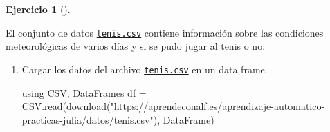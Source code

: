 \documentclass[
  a4paper,
]{scrreport}
\newenvironment{Shaded}{\begin{snugshade}}{\end{snugshade}}
\newcommand{\BuiltInTok}[1]{\textcolor[rgb]{0.00,0.23,0.31}{#1}}
\newcommand{\FunctionTok}[1]{\textcolor[rgb]{0.28,0.35,0.67}{#1}}
\newcommand{\ImportTok}[1]{\textcolor[rgb]{0.00,0.46,0.62}{#1}}
\newcommand{\NormalTok}[1]{\textcolor[rgb]{0.00,0.23,0.31}{#1}}
\newcommand{\OperatorTok}[1]{\textcolor[rgb]{0.37,0.37,0.37}{#1}}
\newcommand{\StringTok}[1]{\textcolor[rgb]{0.13,0.47,0.30}{#1}}
\theoremstyle{definition}
\newtheorem{exercise}{Ejercicio}[chapter]
\theoremstyle{remark}
\begin{document}
\begin{exercise}[]\protect\hypertarget{exr-arboles-decision-1}{}\label{exr-arboles-decision-1}

El conjunto de datos \href{./datos/tenis.csv}{\texttt{tenis.csv}}
contiene información sobre las condiciones meteorológicas de varios días
y si se pudo jugar al tenis o no.

\begin{enumerate}
\def\labelenumi{\alph{enumi}.}
\item
  Cargar los datos del archivo
  \href{https://aprendeconalf.es/aprendizaje-automatico-practicas-julia/datos/tenis.csv}{\texttt{tenis.csv}}
  en un data frame.

  \begin{tcolorbox}[enhanced jigsaw, left=2mm, colback=white, coltitle=black, opacitybacktitle=0.6, titlerule=0mm, breakable, bottomrule=.15mm, toptitle=1mm, bottomtitle=1mm, colbacktitle=quarto-callout-tip-color!10!white, opacityback=0, rightrule=.15mm, title=\textcolor{quarto-callout-tip-color}{\faLightbulb}\hspace{0.5em}{Solución}, colframe=quarto-callout-tip-color-frame, arc=.35mm, leftrule=.75mm, toprule=.15mm]

\begin{Shaded}
\begin{Highlighting}[]
\ImportTok{using} \BuiltInTok{CSV}\NormalTok{, }\BuiltInTok{DataFrames}
\NormalTok{df }\OperatorTok{=}\NormalTok{ CSV.}\FunctionTok{read}\NormalTok{(}\FunctionTok{download}\NormalTok{(}\StringTok{"https://aprendeconalf.es/aprendizaje{-}automatico{-}practicas{-}julia/datos/tenis.csv"}\NormalTok{), DataFrame)}
\end{Highlighting}
\end{Shaded}


\end{tcolorbox}
\end{enumerate}
\end{exercise}
\end{document}
